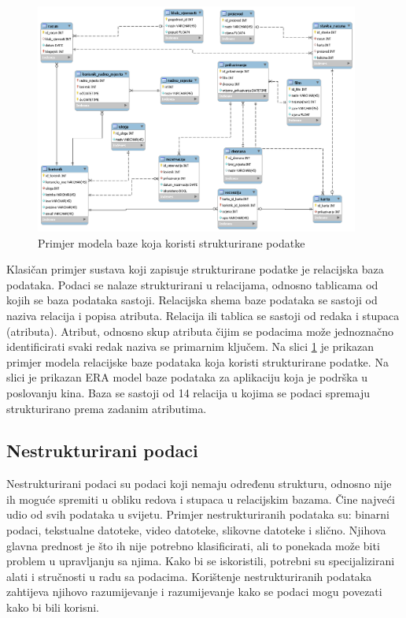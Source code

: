 \documentclass{foi}
\begin{document}
\begin{figure}[h!]
    \centering
    \includegraphics[width=0.95\textwidth]{slike/strukturirani.png}
    \caption{Primjer modela baze koja koristi strukturirane podatke}
    \label{strukturirani}
\end{figure}

Klasičan primjer sustava koji zapisuje strukturirane podatke je relacijska baza podataka. Podaci se nalaze strukturirani u relacijama, odnosno tablicama od kojih se baza podataka sastoji. Relacijska shema baze podataka se sastoji od naziva relacija i popisa atributa. Relacija ili tablica se sastoji od redaka i stupaca (atributa). Atribut, odnosno skup atributa čijim se podacima može jednoznačno identificirati svaki redak naziva se primarnim ključem. \cite{informacijskaTehnologijauPoslovanju} Na slici \ref{strukturirani} je prikazan primjer modela relacijske baze podataka koja koristi strukturirane podatke. Na slici je prikazan ERA model baze podataka za aplikaciju koja je podrška u poslovanju kina. Baza se sastoji od 14 relacija u kojima se podaci spremaju strukturirano prema zadanim atributima.

\subsection{Nestrukturirani podaci}

Nestrukturirani podaci su podaci koji nemaju određenu strukturu, odnosno nije ih moguće spremiti u obliku redova i stupaca u relacijskim bazama. Čine najveći udio od svih podataka u svijetu. Primjer nestrukturiranih podataka su: binarni podaci, tekstualne datoteke, video datoteke, slikovne datoteke i slično. Njihova glavna prednost je što ih nije potrebno klasificirati, ali to ponekada može biti problem u upravljanju sa njima. Kako bi se iskoristili, potrebni su specijalizirani alati i stručnosti u radu sa podacima. Korištenje nestrukturiranih podataka zahtijeva njihovo razumijevanje i razumijevanje kako se podaci mogu povezati kako bi bili korisni. \cite{unstructuredStructuredSemiStructured}
\end{document}
